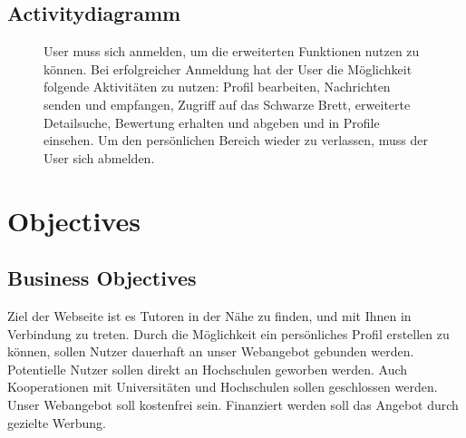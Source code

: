 \documentclass[10pt,a4paper]{scrartcl}
\begin{document}
\subsection{Activitydiagramm}
\begin{figure}[!htbp]
\caption{User muss sich anmelden, um die erweiterten Funktionen nutzen zu können. Bei erfolgreicher Anmeldung hat der User die Möglichkeit folgende Aktivitäten zu nutzen: Profil bearbeiten, Nachrichten senden und empfangen, Zugriff auf das Schwarze Brett, erweiterte Detailsuche, Bewertung erhalten und abgeben und in Profile einsehen. Um den persönlichen Bereich wieder zu verlassen, muss der User sich abmelden. }
\end{figure}
\newpage
\section{Objectives}

\subsection{Business Objectives}
Ziel der Webseite ist es Tutoren in der Nähe zu finden, und mit Ihnen in Verbindung zu treten. Durch die Möglichkeit ein persönliches Profil erstellen zu können, sollen Nutzer dauerhaft an unser Webangebot gebunden werden. Potentielle Nutzer sollen direkt an Hochschulen geworben werden. Auch Kooperationen mit Universitäten und Hochschulen sollen geschlossen werden.
\newline \newline
Unser Webangebot soll kostenfrei sein. Finanziert werden soll das Angebot durch gezielte Werbung.
\end{document}
